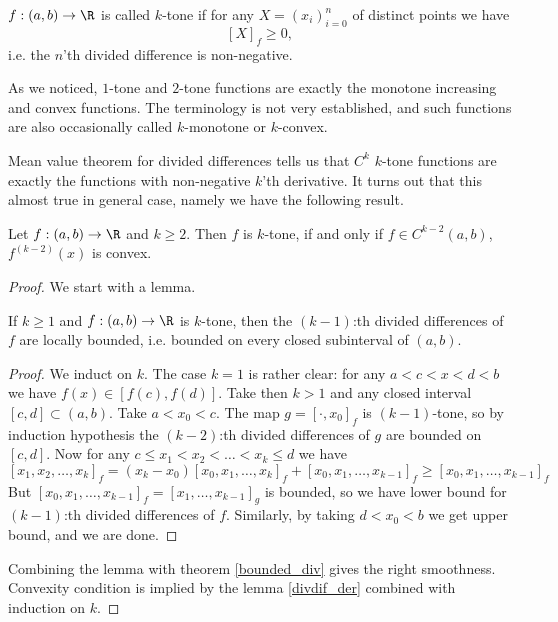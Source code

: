 \begin{maar}
	$f : (a, b) \to \R$ is called $k$-tone if for any $X = (x_{i})_{i = 0}^{n}$ of distinct points we have
	\[
		[X]_{f} \geq 0,
	\]
	i.e. the $n$'th divided difference is non-negative.
\end{maar}

As we noticed, $1$-tone and $2$-tone functions are exactly the monotone increasing and convex functions. The terminology is not very established, and such functions are also occasionally called $k$-monotone or $k$-convex.

Mean value theorem for divided differences tells us that $C^{k}$ $k$-tone functions are exactly the functions with non-negative $k$'th derivative. It turns out that this almost true in general case, namely we have the following result.

\begin{lause}
	Let $f : (a, b) \to \R$ and $k \geq 2$. Then $f$ is $k$-tone, if and only if $f \in C^{k - 2}(a, b)$, $f^{(k - 2)}(x)$ is convex.
\end{lause}

\begin{proof}

	We start with a lemma.
	\begin{lem}
		If $k \geq 1$ and $f : (a, b) \to \R$ is $k$-tone, then the $(k - 1)$:th divided differences of $f$ are locally bounded, i.e. bounded on every closed subinterval of $(a, b)$.
	\end{lem}
	\begin{proof}
		We induct on $k$. The case $k = 1$ is rather clear: for any $a < c < x < d < b$ we have $f(x) \in [f(c), f(d)]$. Take then $k > 1$ and any closed interval $[c, d] \subset (a, b)$. Take $a < x_{0} < c$. The map $g = [\cdot, x_{0}]_{f}$ is $(k - 1)$-tone, so by induction hypothesis the $(k - 2)$:th divided differences of $g$ are bounded on $[c, d]$. Now for any $c \leq x_{1} < x_{2} < \ldots < x_{k} \leq d$ we have
		\[
			[x_{1}, x_{2}, \ldots, x_{k}]_{f} = (x_{k} - x_{0}) [x_{0}, x_{1}, \ldots, x_{k}]_{f} + [x_{0}, x_{1}, \ldots, x_{k - 1}]_{f} \geq [x_{0}, x_{1}, \ldots, x_{k - 1}]_{f}
		\]
		But $[x_{0}, x_{1}, \ldots, x_{k - 1}]_{f} = [x_{1}, \ldots, x_{k - 1}]_{g}$ is bounded, so we have lower bound for $(k - 1)$:th divided differences of $f$. Similarly, by taking $d < x_{0} < b$ we get upper bound, and we are done.
	\end{proof}
	Combining the lemma with theorem \ref{bounded_div} gives the right smoothness. Convexity condition is implied by the lemma \ref{divdif_der} combined with induction on $k$.
\end{proof}


